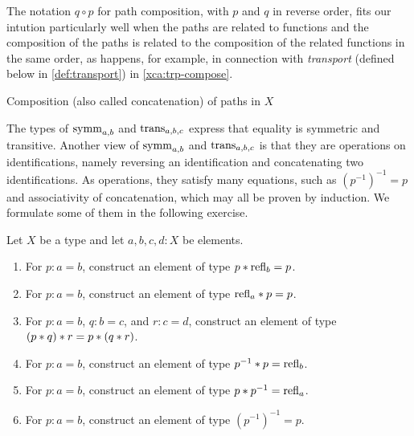 The notation $q\circ p$ for path composition, with $p$ and $q$ in reverse order,
fits our intution particularly well when the paths are related to functions and the composition of
the paths is related to the composition of the related functions in the same order, as happens, for example, in connection with {\em transport}
(defined below in \cref{def:transport}) in \cref{xca:trp-compose}.

\begin{marginfigure}
  \caption{Composition (also called concatenation) of paths in $X$}
  \label{fig:path-concatenation}
\end{marginfigure}

The types of $\symm_{a,b}$ and $\trans_{a,b,c}$ express that
equality is symmetric and transitive. Another view of
$\symm_{a,b}$ and $\trans_{a,b,c}$ is that they are
operations on identifications, namely reversing an identification
and concatenating two identifications. As operations, they satisfy
many equations, such as $(p^{-1})^{-1} = p$ and
associativity of concatenation, which may all be proven by induction.
We formulate some of them in the following exercise.

\begin{xca}\label{xca:path-groupoid-laws}
  Let $X$ be a type and let $a,b,c,d:X$ be elements.
  \begin{enumerate}
    \item For $p:a=b$, construct an element of type $p * \mathrm{refl}_{b} = p$.
    \item For $p:a=b$, construct an element of type $\mathrm{refl}_{a} * p = p$.
    \item For $p:a=b$, $q:b=c$, and $r:c=d$, construct an element of type $(p * q) * r = p * (q * r)$.
    \item For $p:a=b$, construct an element of type $p^{-1} * p = \mathrm{refl}_{b}$.
    \item For $p:a=b$, construct an element of type $p * p^{-1} = \mathrm{refl}_{a}$.
    \item For $p:a=b$, construct an element of type $(p^{-1})^{-1} = p$.
    \qedhere
  \end{enumerate}
\end{xca}

